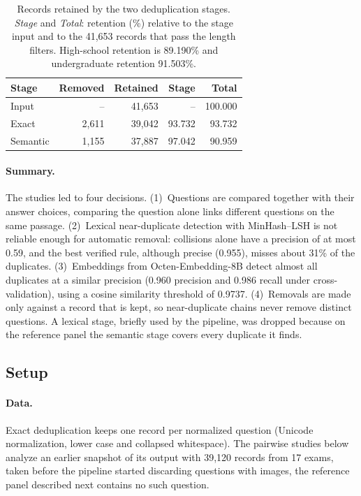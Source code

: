 \begin{table}[t]
\centering
\footnotesize
\setlength{\tabcolsep}{4pt}
\begin{tabular}{@{}lrrrr@{}}
\toprule
Stage & Removed & Retained & Stage & Total \\
\midrule
Input & -- & 41,653 & -- & 100.000 \\
Exact & 2,611 & 39,042 & 93.732 & 93.732 \\
Semantic & 1,155 & 37,887 & 97.042 & 90.959 \\
\bottomrule
\end{tabular}
\caption{Records retained by the two deduplication stages. \emph{Stage} and
\emph{Total}: retention (\%) relative to the stage input and to the 41,653
records that pass the length filters. High-school retention is 89.190\% and
undergraduate retention 91.503\%.}
\label{tab:dedup-short-stages}
\end{table}

\paragraph{Summary.} The studies led to four decisions.
(1)~Questions are compared together with their answer choices, comparing
the question alone links different questions on the same passage.
(2)~Lexical near-duplicate detection with MinHash--LSH is not reliable
enough for automatic removal: collisions alone have a precision of at most
0.59, and the best verified rule, although precise (0.955), misses about 31\%
of the duplicates.
(3)~Embeddings from Octen-Embedding-8B detect almost all duplicates at a
similar precision (0.960 precision and 0.986 recall under cross-validation),
using a cosine similarity threshold of 0.9737.
(4)~Removals are made only against a record that is kept, so near-duplicate
chains never remove distinct questions. A lexical stage, briefly used by the
pipeline, was dropped because on the reference panel the semantic stage
covers every duplicate it finds.

\subsection{Setup}
\label{app:dedup-short-setup}

\paragraph{Data.} Exact deduplication keeps one record per normalized question (Unicode normalization, lower case and collapsed whitespace). The pairwise studies below analyze an
earlier snapshot of its output with 39,120 records from 17 exams, taken
before the pipeline started discarding questions with images, the reference
panel described next contains no such question.

